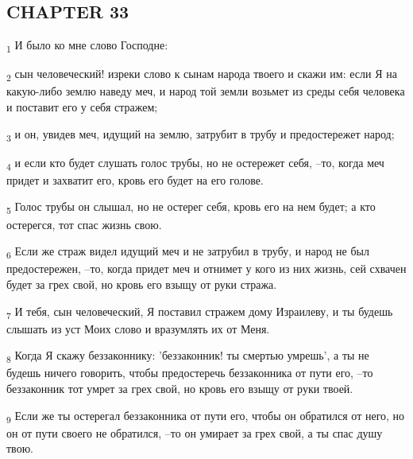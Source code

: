 \subsection{CHAPTER 33}
\begin{tcolorbox}
\textsubscript{1} И было ко мне слово Господне:
\end{tcolorbox}
\begin{tcolorbox}
\textsubscript{2} сын человеческий! изреки слово к сынам народа твоего и скажи им: если Я на какую-либо землю наведу меч, и народ той земли возьмет из среды себя человека и поставит его у себя стражем;
\end{tcolorbox}
\begin{tcolorbox}
\textsubscript{3} и он, увидев меч, идущий на землю, затрубит в трубу и предостережет народ;
\end{tcolorbox}
\begin{tcolorbox}
\textsubscript{4} и если кто будет слушать голос трубы, но не остережет себя, --то, когда меч придет и захватит его, кровь его будет на его голове.
\end{tcolorbox}
\begin{tcolorbox}
\textsubscript{5} Голос трубы он слышал, но не остерег себя, кровь его на нем будет; а кто остерегся, тот спас жизнь свою.
\end{tcolorbox}
\begin{tcolorbox}
\textsubscript{6} Если же страж видел идущий меч и не затрубил в трубу, и народ не был предостережен, --то, когда придет меч и отнимет у кого из них жизнь, сей схвачен будет за грех свой, но кровь его взыщу от руки стража.
\end{tcolorbox}
\begin{tcolorbox}
\textsubscript{7} И тебя, сын человеческий, Я поставил стражем дому Израилеву, и ты будешь слышать из уст Моих слово и вразумлять их от Меня.
\end{tcolorbox}
\begin{tcolorbox}
\textsubscript{8} Когда Я скажу беззаконнику: 'беззаконник! ты смертью умрешь', а ты не будешь ничего говорить, чтобы предостеречь беззаконника от пути его, --то беззаконник тот умрет за грех свой, но кровь его взыщу от руки твоей.
\end{tcolorbox}
\begin{tcolorbox}
\textsubscript{9} Если же ты остерегал беззаконника от пути его, чтобы он обратился от него, но он от пути своего не обратился, --то он умирает за грех свой, а ты спас душу твою.
\end{tcolorbox}
